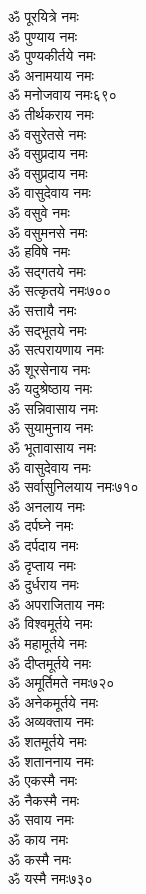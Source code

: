 \begin{center}
\begin{multicols}{2}
\begin{flushleft}
ॐ पूरयित्रे नमः\\
ॐ पुण्याय नमः\\
ॐ पुण्यकीर्तये नमः\\
ॐ अनामयाय नमः\\
ॐ मनोजवाय नमः\hfill ६९०\\
ॐ तीर्थकराय नमः\\
ॐ वसुरेतसे नमः\\
ॐ वसुप्रदाय नमः\\
ॐ वसुप्रदाय नमः\\
ॐ वासुदेवाय नमः\\
ॐ वसुवे नमः\\
ॐ वसुमनसे नमः\\
ॐ हविषे नमः\\
ॐ सद्गतये नमः\\
ॐ सत्कृतये नमः\hfill ७००\\
ॐ सत्तायै नमः\\
ॐ सद्भूतये नमः\\
ॐ सत्परायणाय नमः\\
ॐ शूरसेनाय नमः\\
ॐ यदुश्रेष्ठाय नमः\\
ॐ सन्निवासाय नमः\\
ॐ सुयामुनाय नमः\\
ॐ भूतावासाय नमः\\
ॐ वासुदेवाय नमः\\
ॐ सर्वासुनिलयाय नमः\hfill ७१०\\
ॐ अनलाय नमः\\
ॐ दर्पघ्ने नमः\\
ॐ दर्पदाय नमः\\
ॐ दृप्ताय नमः\\
ॐ दुर्धराय नमः\\
ॐ अपराजिताय नमः\\
ॐ विश्वमूर्तये नमः\\
ॐ महामूर्तये नमः\\
ॐ दीप्तमूर्तये नमः\\
ॐ अमूर्तिमते नमः\hfill ७२०\\
ॐ अनेकमूर्तये नमः\\
ॐ अव्यक्ताय नमः\\
ॐ शतमूर्तये नमः\\
ॐ शताननाय नमः\\
ॐ एकस्मै नमः\\
ॐ नैकस्मै नमः\\
ॐ सवाय नमः\\
ॐ काय नमः\\
ॐ कस्मै नमः\\
ॐ यस्मै नमः\hfill ७३०\\

\end{flushleft}
\end{multicols}
\end{center}
